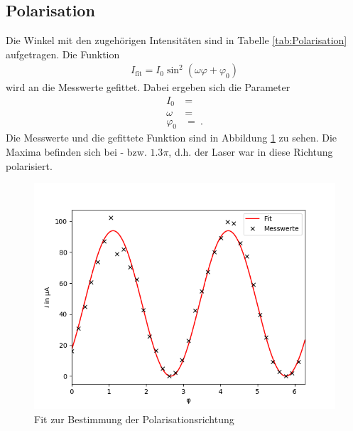 \subsection{Polarisation}
Die Winkel mit den zugehörigen Intensitäten sind in Tabelle \ref{tab:Polarisation} aufgetragen. Die Funktion
\begin{align*}
	I_\text{fit} = I_0\sin^2\left(\omega\varphi + \varphi_0\right)
\end{align*}
wird an die Messwerte gefittet. Dabei ergeben sich die Parameter
\begin{align}
	I_0 &=  \\
	\omega &=  \\
	\varphi_0 &=  \ .
\end{align}
Die Messwerte und die gefittete Funktion sind in Abbildung \ref{fig:fitPol} zu sehen. Die Maxima befinden sich bei - bzw. $1.3\pi$, d.h. der Laser war in diese Richtung polarisiert.
\begin{figure}[h!]
	\centering
	\includegraphics[width=.7\textwidth]{Fit_Polarisation.png}
	\caption{Fit zur Bestimmung der Polarisationsrichtung}
	\label{fig:fitPol}
\end{figure}
